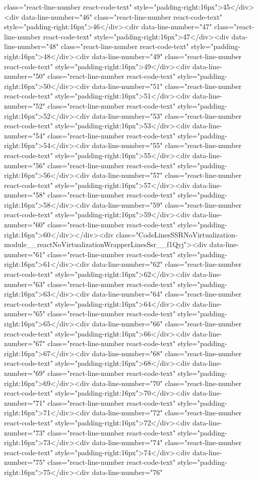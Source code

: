 {{{{{{{class="react-line-number react-code-text" style="padding-right:16px">45</div><div data-line-number="46" class="react-line-number react-code-text" style="padding-right:16px">46</div><div data-line-number="47" class="react-line-number react-code-text" style="padding-right:16px">47</div><div data-line-number="48" class="react-line-number react-code-text" style="padding-right:16px">48</div><div data-line-number="49" class="react-line-number react-code-text" style="padding-right:16px">49</div><div data-line-number="50" class="react-line-number react-code-text" style="padding-right:16px">50</div><div data-line-number="51" class="react-line-number react-code-text" style="padding-right:16px">51</div><div data-line-number="52" class="react-line-number react-code-text" style="padding-right:16px">52</div><div data-line-number="53" class="react-line-number react-code-text" style="padding-right:16px">53</div><div data-line-number="54" class="react-line-number react-code-text" style="padding-right:16px">54</div><div data-line-number="55" class="react-line-number react-code-text" style="padding-right:16px">55</div><div data-line-number="56" class="react-line-number react-code-text" style="padding-right:16px">56</div><div data-line-number="57" class="react-line-number react-code-text" style="padding-right:16px">57</div><div data-line-number="58" class="react-line-number react-code-text" style="padding-right:16px">58</div><div data-line-number="59" class="react-line-number react-code-text" style="padding-right:16px">59</div><div data-line-number="60" class="react-line-number react-code-text" style="padding-right:16px">60</div></div><div class="CodeLinesSSRNoVirtualization-module__reactNoVirtualizationWrapperLinesSsr__f1Qyj"><div data-line-number="61" class="react-line-number react-code-text" style="padding-right:16px">61</div><div data-line-number="62" class="react-line-number react-code-text" style="padding-right:16px">62</div><div data-line-number="63" class="react-line-number react-code-text" style="padding-right:16px">63</div><div data-line-number="64" class="react-line-number react-code-text" style="padding-right:16px">64</div><div data-line-number="65" class="react-line-number react-code-text" style="padding-right:16px">65</div><div data-line-number="66" class="react-line-number react-code-text" style="padding-right:16px">66</div><div data-line-number="67" class="react-line-number react-code-text" style="padding-right:16px">67</div><div data-line-number="68" class="react-line-number react-code-text" style="padding-right:16px">68</div><div data-line-number="69" class="react-line-number react-code-text" style="padding-right:16px">69</div><div data-line-number="70" class="react-line-number react-code-text" style="padding-right:16px">70</div><div data-line-number="71" class="react-line-number react-code-text" style="padding-right:16px">71</div><div data-line-number="72" class="react-line-number react-code-text" style="padding-right:16px">72</div><div data-line-number="73" class="react-line-number react-code-text" style="padding-right:16px">73</div><div data-line-number="74" class="react-line-number react-code-text" style="padding-right:16px">74</div><div data-line-number="75" class="react-line-number react-code-text" style="padding-right:16px">75</div><div data-line-number="76" }}}}}}}
